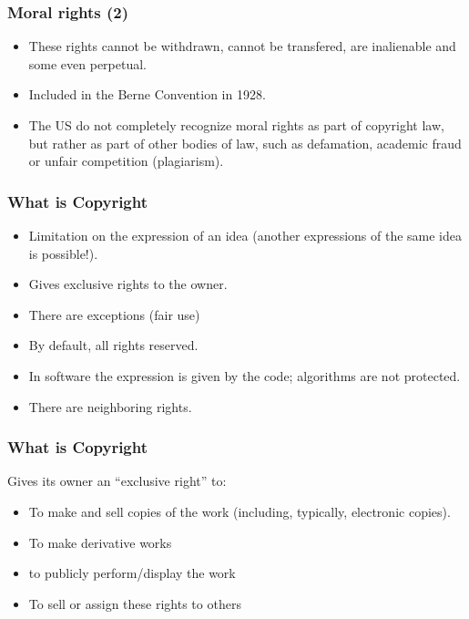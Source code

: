 
\begin{frame}
\frametitle{Moral rights (2)}

\begin{itemize}
\item These rights cannot be withdrawn, cannot be transfered, are inalienable
and some even perpetual.
\item Included in the Berne Convention in 1928. 
\item The US do not completely recognize moral rights as part of copyright law, but rather as part of other bodies of law, such as defamation, academic fraud or unfair competition (plagiarism).
\end{itemize}


\end{frame}





\begin{frame}
\frametitle{What is Copyright}

\begin{itemize}
\item Limitation on the \alert{expression} of an idea (another expressions of the same idea is possible!).
\item Gives exclusive rights to the owner.
\item There are exceptions (fair use)
\item By default, all rights reserved.
\item In software the expression is given by the code; algorithms are
not protected.
\item There are neighboring rights.
\end{itemize}

\end{frame}



\begin{frame}
\frametitle{What is Copyright}

Gives its owner an ``exclusive right'' to:

\begin{itemize}
\item To make and sell copies of the work (including,
typically, electronic copies).
\item To make derivative works
\item to publicly perform/display the work
\item To sell or assign these rights to others
\end{itemize}

\end{frame}

